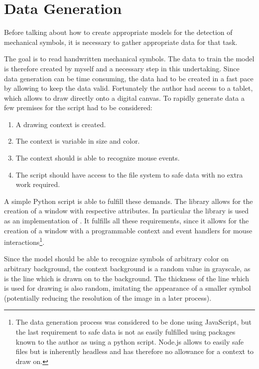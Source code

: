\section{Data Generation}

Before talking about how to create appropriate models for the detection of
mechanical symbols, it is necessary to gather appropriate data for that task.

The goal is to read handwritten mechanical symbols.
The data to train the model is therefore created by myself and a necessary step in this undertaking.
Since data generation can be time consuming, the data had to be created in a fast pace by allowing to keep the data valid.
Fortunately the author had access to a tablet, which allows to draw directly onto a digital canvas.
To rapidly generate data a few premises for the script had to be considered:
\begin{enumerate}
    \item A drawing context is created.
    \item The context is variable in size and color.
    \item The context should is able to recognize mouse events.
    \item The script should have access to the file system to safe data with no extra work required.
\end{enumerate}

A simple Python script is able to fulfill these demands.
The library \cite{OpenCV2019} allows for the creation of a window with respective attributes. In particular the library \cite{Heinisuo2019} is used as an implementation of .
It fulfills all these requirements, since it allows for the creation of a window with a programmable context and event handlers for mouse interactions\footnote{ The data generation process was considered to be done using JavaScript, but the last requirement to safe data is not as easily fulfilled using packages known to the author as using a python script. Node.js allows to easily safe files but is inherently headless and has therefore no allowance for a context to draw on. }.

Since the model should be able to recognize symbols of arbitrary color on arbitrary background, the context background is a random value in grayscale, as is the line which is drawn on to the background.
The thickness of the line which is used for drawing is also random, imitating the appearance of a smaller symbol (potentially reducing the resolution of the image in a later process).

